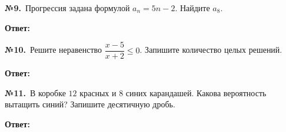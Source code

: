 \documentclass[a4paper,11pt]{article}
\renewcommand{\TaskBox}[2]{%
  \par\nopagebreak\noindent
  {\bfseries\color{wcprimary}№#1.}\ #2\par
  \vspace{1mm}{\color{wcprimary!40}\rule{\linewidth}{0.3pt}}\par\vspace{2mm}}
\begin{document}
\TaskBox{9}{Прогрессия задана формулой $a_n = 5n - 2$. Найдите $a_8$.\par\vspace{0.5mm}\hfill\textbf{Ответ:}~\AnswerField{9}}

\TaskBox{10}{Решите неравенство $\dfrac{x - 5}{x + 2} \leqslant 0$. Запишите количество целых решений.\par\vspace{0.5mm}\hfill\textbf{Ответ:}~\AnswerField{10}}

\TaskBox{11}{В коробке $12$ красных и $8$ синих карандашей. Какова вероятность вытащить синий? Запишите десятичную дробь.\par\vspace{0.5mm}\hfill\textbf{Ответ:}~\AnswerField{11}}

\end{document}
